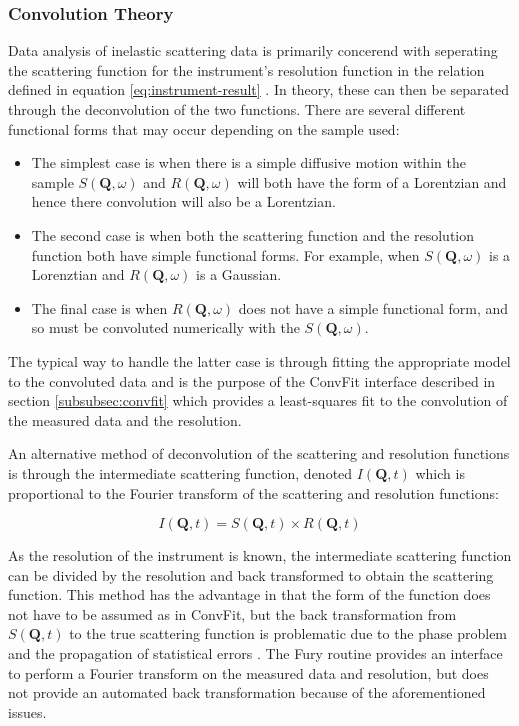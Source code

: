 \documentclass[paper=a4, fontsize=11pt]{scrartcl}	%
\numberwithin{equation}{section}															%
\numberwithin{figure}{section}																%
\numberwithin{table}{section}																%
\begin{document}
\subsubsection{Convolution Theory}
Data analysis of inelastic scattering data is primarily concerend with seperating the scattering function for the instrument's resolution function in the relation defined in equation \ref{eq:instrument-result} . In theory, these can then be separated through the deconvolution of the two functions. There are several different functional forms that may occur depending on the sample used:

\begin{itemize}
\item The simplest case is when there is a simple diffusive motion within the sample $S(\mathbf{Q},\omega)$ and $R(\mathbf{Q},\omega)$ will both have the form of a Lorentzian and hence there convolution will also be a Lorentzian.

\item The second case is when both the scattering function and the resolution function both have simple functional forms. For example, when $S(\mathbf{Q},\omega)$ is a Lorenztian and $R(\mathbf{Q},\omega)$ is a Gaussian.

\item The final case is when $R(\mathbf{Q}, \omega)$ does not have a simple functional form, and so must be convoluted numerically with the $S(\mathbf{Q}, \omega)$.
\end{itemize}

The typical way to handle the latter case is through fitting the appropriate model to the convoluted data and is the purpose of the ConvFit interface described in section \ref{subsubsec:convfit} which provides a least-squares fit to the convolution of the measured data and the resolution.

An alternative method of deconvolution of the scattering and resolution functions is through the intermediate scattering function, denoted $I(\mathbf{Q}, t)$ which is proportional to the Fourier transform of the scattering and resolution functions:

\begin{equation}
I(\mathbf{Q}, t) = S(\mathbf{Q}, t) \times R(\mathbf{Q}, t)
\end{equation}

As the resolution of the instrument is known, the intermediate scattering function can be divided by the resolution and back transformed to obtain the scattering function. This method has the advantage in that the form of the function does not have to be assumed as in ConvFit, but the back transformation from $S(\mathbf{Q}, t)$ to the true scattering function is problematic due to the phase problem \cite{dssivia2011} and the propagation of statistical errors \cite{wild1977measurement}. The Fury routine provides an interface to perform a Fourier transform on the measured data and resolution, but does not provide an automated back transformation because of the aforementioned issues.
\end{document}
